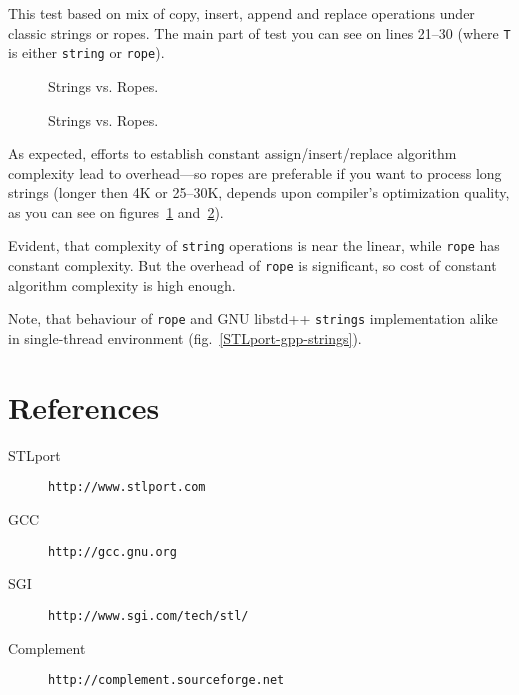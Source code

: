 \documentclass[a4paper]{article}
\providecommand{\libstd}{{\fontfamily{cmtt}\selectfont GNU \mbox{libstd++}}}
\begin{document}
This test based on mix of copy, insert, append and replace
operations under classic strings or ropes. The main part
of test you can see on lines 21--30 (where \texttt{T} is
either \texttt{string} or \texttt{rope}).



\begin{figure}
  \begin{center}
    
  \end{center}
  \caption{Strings vs. Ropes.\label{STLport-rope-string}}
\end{figure}

\begin{figure}
  \begin{center}
    
  \end{center}
  \caption{Strings vs. Ropes.\label{STLport-rope-string-1}}
\end{figure}

As expected, efforts to establish constant assign/insert/replace
algorithm complexity lead to
overhead---so ropes are preferable if you want to process
long strings (longer then 4K or 25--30K, depends upon compiler's optimization quality, as you can see on figures~\ref{STLport-rope-string} and~\ref{STLport-rope-string-1}).

Evident, that complexity of \texttt{string} operations is near the linear,
while \texttt{rope} has constant complexity. But the overhead
of \texttt{rope} is significant, so cost of constant algorithm complexity
is high enough.

Note, that behaviour of \texttt{rope} and \libstd{} \texttt{strings} implementation
alike in single-thread environment (fig.~\ref{STLport-gpp-strings}).

\section{References}

\noindent
\begin{description}
  \item[STLport] \texttt{http://www.stlport.com}
  \item[GCC]     \texttt{http://gcc.gnu.org}
  \item[SGI]     \texttt{http://www.sgi.com/tech/stl/}
  \item[Complement] \texttt{http://complement.sourceforge.net}
\end{description}
\end{document}
